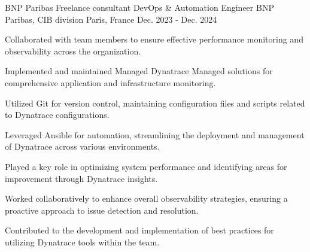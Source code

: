 
\begin{cventries}

\cventry
{BNP Paribas Freelance consultant DevOps \& Automation Engineer} %
{BNP Paribas, CIB division} %
{Paris, France} %
{Dec. 2023 - Dec. 2024} %
{
  \begin{cvitems} %
    \item {Collaborated with team members to ensure effective performance monitoring and observability across the organization.}
    \item {Implemented and maintained Managed Dynatrace Managed solutions for comprehensive application and infrastructure monitoring.}
    \item {Utilized Git for version control, maintaining configuration files and scripts related to Dynatrace configurations.}
    \item {Leveraged Ansible for automation, streamlining the deployment and management of Dynatrace across various environments.}
    \item {Played a key role in optimizing system performance and identifying areas for improvement through Dynatrace insights.}
    \item {Worked collaboratively to enhance overall observability strategies, ensuring a proactive approach to issue detection and resolution.}
    \item {Contributed to the development and implementation of best practices for utilizing Dynatrace tools within the team.}
  \end{cvitems}
}


\end{cventries}
